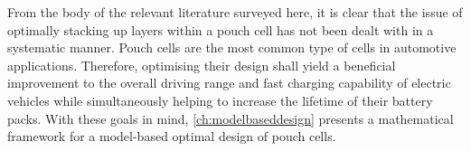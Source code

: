 From the  body of the  relevant literature surveyed here,  it is clear  that the
issue of  optimally stacking up  layers within a pouch  cell has not  been dealt
with in a  systematic manner. Pouch cells  are the most common type  of cells in
automotive  applications.  Therefore,  optimising  their design  shall  yield  a
beneficial improvement to the overall driving range and fast charging capability
of electric  vehicles while simultaneously  helping to increase the  lifetime of
their  battery  packs.  With  these goals  in  mind,  \cref{ch:modelbaseddesign}
presents  a mathematical  framework for  a model-based  optimal design  of pouch
cells.


